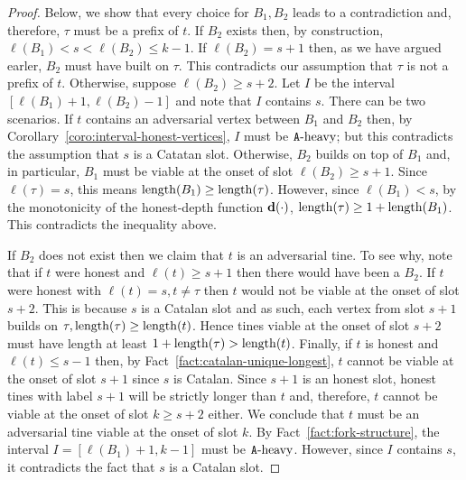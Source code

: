 \begin{proof}
    Below, we show that every choice for $B_1, B_2$ leads to a contradiction 
    and, therefore, $\tau$ must be a prefix of $t$. 
    If $B_2$ exists then, 
    by construction, $\ell(B_1) < s < \ell(B_2) \leq k - 1$.
    If $\ell(B_2) = s + 1$ then, as we have argued earler, 
    $B_2$ must have built on $\tau$. 
    This contradicts our assumption that 
    $\tau$ is not a prefix of $t$. 
    Otherwise, suppose $\ell(B_2) \geq s + 2$.  
    Let $I$ be the interval $[\ell(B_1) + 1, \ell(B_2) - 1]$ and note that  
    $I$ contains $s$. 
    There can be two scenarios.
    If $t$ contains an adversarial vertex between $B_1$ and $B_2$ then,  
    by Corollary~\ref{coro:interval-honest-vertices}, 
    $I$ must be $\mathtt{A}\text{-heavy}$; but 
    this contradicts the assumption that $s$ is a Catatan slot. 
    Otherwise,
    $B_2$ builds on top of $B_1$ and, 
    in particular, 
    $B_1$ must be viable at the onset of slot $\ell(B_2) \geq s + 1$. 
    Since $\ell(\tau) = s$, this means $\operatorname{length}(B_1) \geq \operatorname{length}(\tau)$. 
    However, since $\ell(B_1) < s$, 
    by the monotonicity of the honest-depth function $\mathbf{d}(\cdot)$, 
    $\operatorname{length}(\tau) \geq 1 + \operatorname{length}(B_1)$. 
    This contradicts the inequality above.           

    If $B_2$ does not exist then 
    we claim that $t$ is an adversarial tine. 
    To see why, note that if $t$ were honest and $\ell(t) \geq s + 1$ 
    then there would have been a $B_2$. 
    If $t$ were honest with $\ell(t) = s, t \neq \tau$ 
    then $t$ would not be viable at the onset of slot $s + 2$. 
    This is because $s$ is a Catalan slot and as such, 
    each vertex from slot $s + 1$ builds on $\tau, \operatorname{length}(\tau) \geq \operatorname{length}(t)$. 
    Hence tines viable at the onset of slot $s + 2$ must have length at least $1 + \operatorname{length}(\tau) > \operatorname{length}(t)$. 
    Finally, if $t$ is honest and $\ell(t) \leq s - 1$ then, 
    by Fact~\ref{fact:catalan-unique-longest}, 
    $t$ cannot be viable at the onset of slot $s + 1$ 
    since $s$ is Catalan.  
    Since $s + 1$ is an honest slot, 
    honest tines with label $s + 1$ will be strictly longer than $t$ 
    and, therefore, 
    $t$ cannot be viable at the onset of slot $k \geq s + 2$ either. 
    We conclude that $t$ must be an adversarial tine viable at the onset of slot $k$. 
    By Fact~\ref{fact:fork-structure},       
    the interval $I = [\ell(B_1) + 1, k - 1]$ must be $\mathtt{A}\text{-heavy}$. 
    However, since $I$ contains $s$, it contradicts the fact that $s$ is a Catalan slot.     
  \end{proof}
